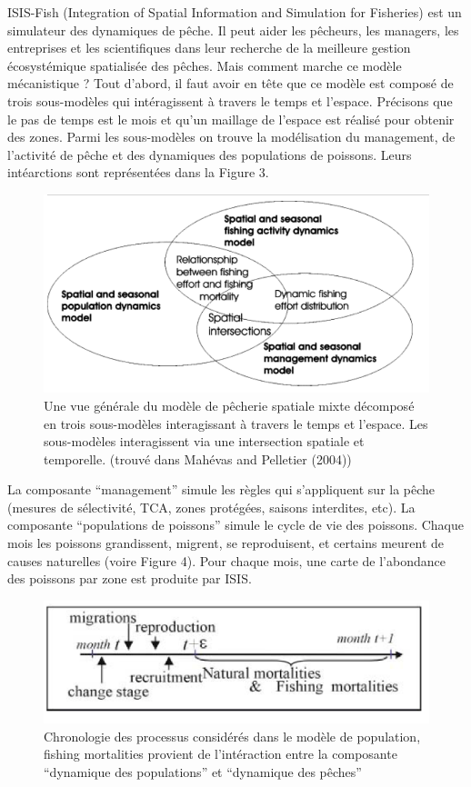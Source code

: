 \documentclass[
]{article}
\begin{document}
ISIS-Fish (Integration of Spatial Information and Simulation for
Fisheries) est un simulateur des dynamiques de pêche. Il peut aider les
pêcheurs, les managers, les entreprises et les scientifiques dans leur
recherche de la meilleure gestion écosystémique spatialisée des pêches.
Mais comment marche ce modèle mécanistique ? Tout d'abord, il faut avoir
en tête que ce modèle est composé de trois sous-modèles qui
intéragissent à travers le temps et l'espace. Précisons que le pas de
temps est le mois et qu'un maillage de l'espace est réalisé pour obtenir
des zones. Parmi les sous-modèles on trouve la modélisation du
management, de l'activité de pêche et des dynamiques des populations de
poissons. Leurs intéarctions sont représentées dans la Figure 3.

\begin{figure}
\centering
\includegraphics{3sousModeles.png}
\caption{Une vue générale du modèle de pêcherie spatiale mixte décomposé
en trois sous-modèles interagissant à travers le temps et l'espace. Les
sous-modèles interagissent via une intersection spatiale et temporelle.
(trouvé dans Mahévas and Pelletier (2004))}
\end{figure}

La composante ``management'' simule les règles qui s'appliquent sur la
pêche (mesures de sélectivité, TCA, zones protégées, saisons interdites,
etc). La composante ``populations de poissons'' simule le cycle de vie
des poissons. Chaque mois les poissons grandissent, migrent, se
reproduisent, et certains meurent de causes naturelles (voire Figure 4).
Pour chaque mois, une carte de l'abondance des poissons par zone est
produite par ISIS.

\begin{figure}
\centering
\includegraphics{processusPopModele.png}
\caption{Chronologie des processus considérés dans le modèle de
population, fishing mortalities provient de l'intéraction entre la
composante ``dynamique des populations'' et ``dynamique des pêches''}
\end{figure}
\end{document}

